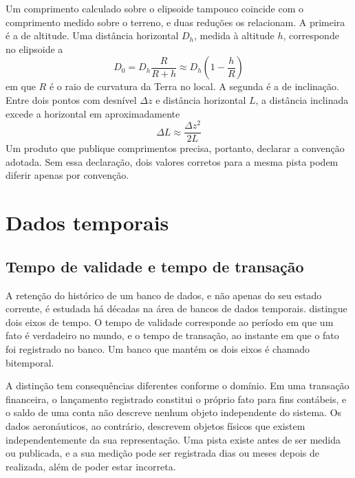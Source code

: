 Um comprimento calculado sobre o elipsoide tampouco coincide com o comprimento medido sobre o terreno, e duas reduções os relacionam. A primeira é a de altitude. Uma distância horizontal $D_h$, medida à altitude $h$, corresponde no elipsoide a
\begin{equation}
    D_0 = D_h \frac{R}{R + h} \approx D_h \left(1 - \frac{h}{R}\right)
    \label{eq:reducao-altitude}
\end{equation}
em que $R$ é o raio de curvatura da Terra no local. A segunda é a de inclinação. Entre dois pontos com desnível $\Delta z$ e distância horizontal $L$, a distância inclinada excede a horizontal em aproximadamente
\begin{equation}
    \Delta L \approx \frac{\Delta z^2}{2L}
    \label{eq:reducao-inclinacao}
\end{equation}
Um produto que publique comprimentos precisa, portanto, declarar a convenção adotada. Sem essa declaração, dois valores corretos para a mesma pista podem diferir apenas por convenção.

\section{Dados temporais}\label{sec:temporal}

\subsection{Tempo de validade e tempo de transação}\label{sec:bitemporal}

A retenção do histórico de um banco de dados, e não apenas do seu estado corrente, é estudada há décadas na área de bancos de dados temporais.  distingue dois eixos de tempo. O tempo de validade corresponde ao período em que um fato é verdadeiro no mundo, e o tempo de transação, ao instante em que o fato foi registrado no banco. Um banco que mantém os dois eixos é chamado bitemporal.

A distinção tem consequências diferentes conforme o domínio. Em uma transação financeira, o lançamento registrado constitui o próprio fato para fins contábeis, e o saldo de uma conta não descreve nenhum objeto independente do sistema. Os dados aeronáuticos, ao contrário, descrevem objetos físicos que existem independentemente da sua representação. Uma pista existe antes de ser medida ou publicada, e a sua medição pode ser registrada dias ou meses depois de realizada, além de poder estar incorreta.

